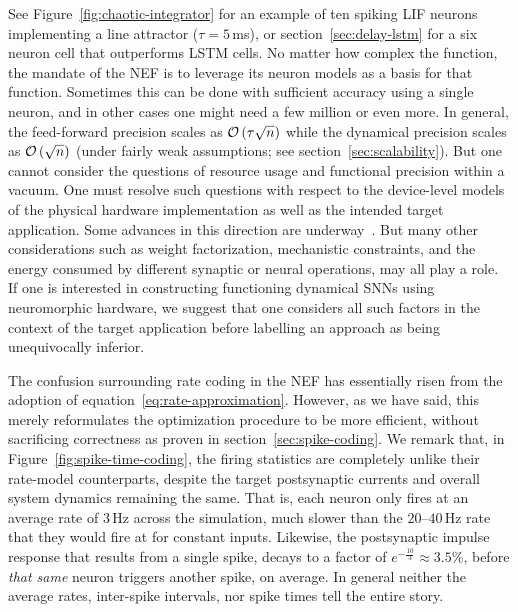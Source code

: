 See Figure~\ref{fig:chaotic-integrator} for an example of ten spiking LIF neurons implementing a line attractor ($\tau = 5$\,ms), or section~\ref{sec:delay-lstm} for a six neuron cell that outperforms LSTM cells.
No matter how complex the function, the mandate of the NEF is to leverage its neuron models as a basis for that function. 
Sometimes this can be done with sufficient accuracy using a single neuron, and in other cases one might need a few million or even more.
In general, the feed-forward precision scales as $\mathcal{O}\left({\tau \sqrt{n}}\right)$ while the dynamical precision scales as $\mathcal{O}\left({\sqrt{n}}\right)$ (under fairly weak assumptions; see section~\ref{sec:scalability}).
But one cannot consider the questions of resource usage and functional precision within a vacuum.
One must resolve such questions with respect to the device-level models of the physical hardware implementation as well as the intended target application.
Some advances in this direction are underway~\citep{schwemmer2015constructing, thalmeier2016learning}.
But many other considerations such as weight factorization, mechanistic constraints, and the energy consumed by different synaptic or neural operations, may all play a role.
If one is interested in constructing functioning dynamical SNNs using neuromorphic hardware, we suggest that one considers all such factors in the context of the target application before labelling an approach as being unequivocally inferior.

The confusion surrounding rate coding in the NEF has essentially risen from the adoption of equation~\ref{eq:rate-approximation}.
However, as we have said, this merely reformulates the optimization procedure to be more efficient, without sacrificing correctness as proven in section~\ref{sec:spike-coding}.
We remark that, in Figure~\ref{fig:spike-time-coding}, the firing statistics are completely unlike their rate-model counterparts, despite the target postsynaptic currents and overall system dynamics remaining the same.
That is, each neuron only fires at an average rate of $3$\,Hz across the simulation, much slower than the $20$--$40$\,Hz rate that they would fire at for constant inputs.
Likewise, the postsynaptic impulse response that results from a single spike, decays to a factor of $e^{-\frac{10}{3}} \approx 3.5\%$, before \emph{that same} neuron triggers another spike, on average.
In general neither the average rates, inter-spike intervals, nor spike times tell the entire story.

